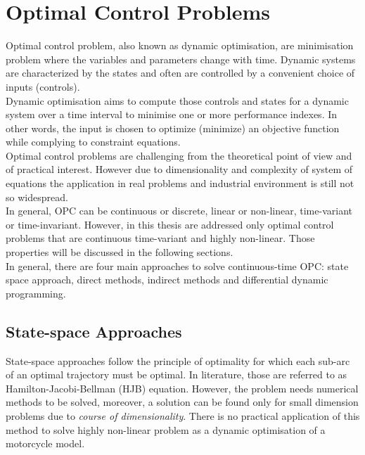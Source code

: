 \section{Optimal Control Problems}
%
Optimal control problem, also known as dynamic optimisation, are minimisation problem where the variables and parameters change with time. Dynamic systems are characterized by the states and often are controlled by a convenient choice of inputs (controls).\\
Dynamic optimisation aims to compute those controls and states for a dynamic system over a time interval to minimise one or more performance indexes. In other words, the input is chosen to optimize (minimize) an objective function while complying to constraint equations.\\
Optimal control problems are challenging from the theoretical point of view and of practical interest. However due to dimensionality and complexity of system of equations the application in real problems and industrial environment is still not so widespread.\\
In general, OPC can be continuous or discrete, linear or non-linear, time-variant or time-invariant. However, in this thesis are addressed only optimal control problems that are continuous time-variant and highly non-linear. Those properties will be discussed in the following sections.\\
In general, there are four main approaches to solve continuous-time OPC: state space approach, direct methods, indirect methods and differential dynamic programming.
%
\subsection{State-space Approaches}
%
State-space approaches follow the principle of optimality for which each sub-arc of an optimal trajectory must be optimal. In literature, those are referred to as Hamilton-Jacobi-Bellman (HJB) equation. However, the problem needs numerical methods to be solved, moreover, a solution can be found only for small dimension problems due to \textit{course of dimensionality}. There is no practical application of this method to solve highly non-linear problem as a dynamic optimisation of a motorcycle model.
%
